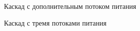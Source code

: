 \begin{figure}[ht]
  \caption{Каскад с дополнительным потоком питания}\label{fig:2_inputs}
\end{figure}

\begin{figure}[ht]
  \caption{Каскад с тремя потоками питания}\label{fig:3_inputs}
\end{figure}

